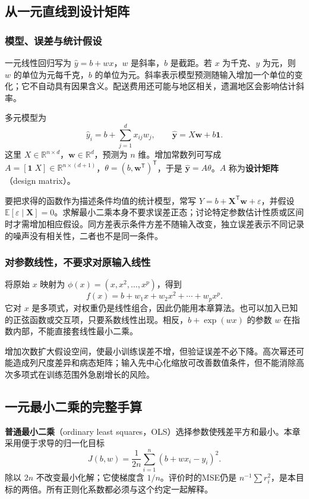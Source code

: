 \documentclass[UTF8,fontset=none,zihao=-4,a4paper]{ctexart}
\newcommand{\term}[1]{\textbf{#1}}
\numberwithin{equation}{section}
\numberwithin{figure}{section}
\begin{document}
\subsection{从一元直线到设计矩阵}
\subsubsection{模型、误差与统计假设}
一元线性回归写为 $\widehat y=b+wx$，$w$ 是斜率，$b$ 是截距。若 $x$ 为千克、$y$ 为元，则 $w$ 的单位为元每千克，$b$ 的单位为元。斜率表示模型预测随输入增加一个单位的变化；它不自动具有因果含义。配送费用还可能与地区相关，遗漏地区会影响估计斜率。

多元模型为
\begin{equation}
 \widehat y_i=b+\sum_{j=1}^d x_{ij}w_j,
 \qquad \widehat{\symbf y}=X\symbf w+b\symbf1.
\end{equation}
这里 $X\in\mathbb R^{n\times d}$，$\symbf w\in\mathbb R^d$，预测为 $n$ 维。增加常数列可写成 $A=[\symbf1\;X]\in\mathbb R^{n\times(d+1)}$，$\theta=(b,\symbf w^{\mathsf T})^{\mathsf T}$，于是 $\widehat{\symbf y}=A\theta$。$A$ 称为\term{设计矩阵}（design matrix）。

要把求得的函数作为描述条件均值的统计模型，常写 $Y=b+\symbf X^{\mathsf T}\symbf w+\varepsilon$，并假设 $\mathbb E[\varepsilon\mid\symbf X]=0$。求解最小二乘本身不要求误差正态；讨论特定参数估计性质或区间时才需增加相应假设。同方差表示条件方差不随输入改变，独立误差表示不同记录的噪声没有相关性，二者也不是同一条件。

\subsubsection{对参数线性，不要求对原输入线性}
将原始 $x$ 映射为 $\phi(x)=(x,x^2,\ldots,x^p)$，得到
\[
 f(x)=b+w_1x+w_2x^2+\cdots+w_px^p.
\]
它对 $x$ 是多项式，对权重仍是线性组合，因此仍能用本章算法。也可以加入已知的正弦函数或交互项，只要系数线性出现。相反，$b+\exp(wx)$ 的参数 $w$ 在指数内部，不能直接套线性最小二乘。

增加次数扩大假设空间，使最小训练误差不增，但验证误差不必下降。高次幂还可能造成列尺度差异和病态矩阵；输入先中心化缩放可改善数值条件，但不能消除高次多项式在训练范围外急剧增长的风险。

\subsection{一元最小二乘的完整手算}
\term{普通最小二乘}（ordinary least squares，OLS）选择参数使残差平方和最小。本章采用便于求导的归一化目标
\begin{equation}
 J(b,w)=\frac1{2n}\sum_{i=1}^n(b+wx_i-y_i)^2.
\end{equation}
除以 $2n$ 不改变最小化解；它使梯度含 $1/n$。评价时的MSE仍是 $n^{-1}\sum r_i^2$，是本目标的两倍。所有正则化系数都必须与这个约定一起解释。
\end{document}
